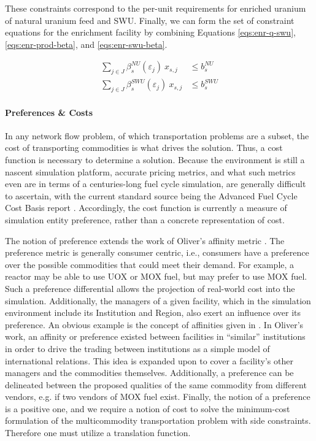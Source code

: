 These constraints correspond to the per-unit requirements for enriched uranium
of natural uranium feed and SWU. Finally, we can form the set of constraint
equations for the enrichment facility by combining Equations
\ref{eqs:enr-q-swu}, \ref{eqs:enr-prod-beta}, and \ref{eqs:enr-swu-beta}.

\begin{align}
\label{eqs:enr-prod-constr}
\sum_{j \in J}\beta_{s}^{NU}(\varepsilon_{j}) \: x_{s,j}  & \leq b_{s}^{NU} \\
\label{eqs:enr-swu-constr}
\sum_{j \in J}\beta_{s}^{SWU}(\varepsilon_{j}) \: x_{s,j} & \leq b_{s}^{SWU}
\end{align}

\paragraph{Preferences \& Costs}

In any network flow problem, of which transportation problems are a subset, the
cost of transporting commodities is what drives the solution. Thus, a cost
function is necessary to determine a solution. Because the \Cyclus environment
is still a nascent simulation platform, accurate pricing metrics, and what such
metrics even are in terms of a centuries-long fuel cycle simulation, are
generally difficult to ascertain, with the current standard source being the
Advanced Fuel Cycle Cost Basis report
\cite{shropshire_advanced_2009}. Accordingly, the cost function is currently a
measure of simulation entity preference, rather than a concrete representation
of cost.

The notion of preference extends the work of Oliver's affinity metric
\cite{oliver_geniusv2:_2009}. The preference metric is generally consumer
centric, i.e., consumers have a preference over the possible commodities that
could meet their demand. For example, a reactor may be able to use UOX or MOX
fuel, but may prefer to use MOX fuel. Such a preference differential allows the
projection of real-world cost into the simulation. Additionally, the managers of
a given facility, which in the \Cyclus simulation environment include its
Institution and Region, also exert an influence over its preference. An obvious
example is the concept of affinities given in \cite{oliver_geniusv2:_2009}. In
Oliver's work, an affinity or preference existed between facilities in
``similar'' institutions in order to drive the trading between institutions as a
simple model of international relations. This idea is expanded upon to cover a
facility's other managers and the commodities themselves. Additionally, a
preference can be delineated between the proposed qualities of the same
commodity from different vendors, e.g. if two vendors of MOX fuel
exist. Finally, the notion of a preference is a positive one, and we require a
notion of cost to solve the minimum-cost formulation of the multicommodity
transportation problem with side constraints. Therefore one must utilize a
translation function.

